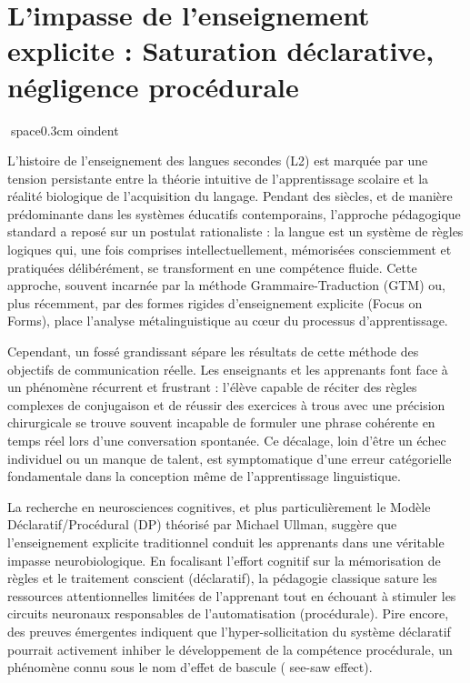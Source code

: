 

\section{L'impasse de l'enseignement explicite : Saturation déclarative, négligence procédurale}
space{0.3cm}
oindent

L'histoire de l'enseignement des langues secondes (L2) est marquée par une tension persistante entre
la théorie intuitive de l'apprentissage scolaire et la réalité biologique de l'acquisition du
langage. Pendant des siècles, et de manière prédominante dans les systèmes éducatifs contemporains,
l'approche pédagogique standard a reposé sur un postulat rationaliste : la langue est un système de
règles logiques qui, une fois comprises intellectuellement, mémorisées consciemment et pratiquées
délibérément, se transforment en une compétence fluide. Cette approche, souvent incarnée par la
méthode \og Grammaire-Traduction\fg{} (GTM) ou, plus récemment, par des formes rigides
d'enseignement explicite (Focus on Forms), place l'analyse métalinguistique au cœur du processus
d'apprentissage.

Cependant, un fossé grandissant sépare les résultats de cette méthode des objectifs de communication
réelle. Les enseignants et les apprenants font face à un phénomène récurrent et frustrant : l'élève
capable de réciter des règles complexes de conjugaison et de réussir des exercices à trous avec une
précision chirurgicale se trouve souvent incapable de formuler une phrase cohérente en temps réel
lors d'une conversation spontanée. Ce décalage, loin d'être un échec individuel ou un manque de \og
talent\fg{}, est symptomatique d'une erreur catégorielle fondamentale dans la conception même de
l'apprentissage linguistique.

La recherche en neurosciences cognitives, et plus particulièrement le Modèle Déclaratif/Procédural
(DP) théorisé par Michael Ullman, suggère que l'enseignement explicite traditionnel conduit les
apprenants dans une véritable impasse neurobiologique. En focalisant l'effort cognitif sur la
mémorisation de règles et le traitement conscient (déclaratif), la pédagogie classique sature les
ressources attentionnelles limitées de l'apprenant tout en échouant à stimuler les circuits
neuronaux responsables de l'automatisation (procédurale). Pire encore, des preuves émergentes
indiquent que l'hyper-sollicitation du système déclaratif pourrait activement inhiber le
développement de la compétence procédurale, un phénomène connu sous le nom d'effet de bascule (\og
see-saw effect\fg{}).


